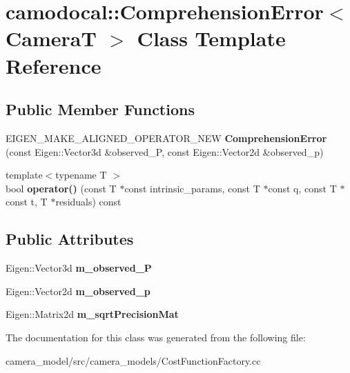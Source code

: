 \hypertarget{classcamodocal_1_1ComprehensionError}{}\section{camodocal\+:\+:Comprehension\+Error$<$ CameraT $>$ Class Template Reference}
\label{classcamodocal_1_1ComprehensionError}
\subsection*{Public Member Functions}
\begin{DoxyCompactItemize}
\item 
\mbox{\label{classcamodocal_1_1ComprehensionError_ac752cd669997ffc76e1d2c2163804182}} 
E\+I\+G\+E\+N\+\_\+\+M\+A\+K\+E\+\_\+\+A\+L\+I\+G\+N\+E\+D\+\_\+\+O\+P\+E\+R\+A\+T\+O\+R\+\_\+\+N\+EW {\bfseries Comprehension\+Error} (const Eigen\+::\+Vector3d \&observed\+\_\+P, const Eigen\+::\+Vector2d \&observed\+\_\+p)
\item 
\mbox{\label{classcamodocal_1_1ComprehensionError_ad9a8971ba9336b8b38178b07b69822b6}} 
{\footnotesize template$<$typename T $>$ }\\bool {\bfseries operator()} (const T $\ast$const intrinsic\+\_\+params, const T $\ast$const q, const T $\ast$const t, T $\ast$residuals) const
\end{DoxyCompactItemize}
\subsection*{Public Attributes}
\begin{DoxyCompactItemize}
\item 
\mbox{\label{classcamodocal_1_1ComprehensionError_a5614ebe2c0f896e1ed4f82604d2112ee}} 
Eigen\+::\+Vector3d {\bfseries m\+\_\+observed\+\_\+P}
\item 
\mbox{\label{classcamodocal_1_1ComprehensionError_a498f32b3b4466b94339a0cb361b6f1f0}} 
Eigen\+::\+Vector2d {\bfseries m\+\_\+observed\+\_\+p}
\item 
\mbox{\label{classcamodocal_1_1ComprehensionError_a2e6556951a4f4967089f090f248cd236}} 
Eigen\+::\+Matrix2d {\bfseries m\+\_\+sqrt\+Precision\+Mat}
\end{DoxyCompactItemize}


The documentation for this class was generated from the following file\+:\begin{DoxyCompactItemize}
\item 
camera\+\_\+model/src/camera\+\_\+models/Cost\+Function\+Factory.\+cc\end{DoxyCompactItemize}
